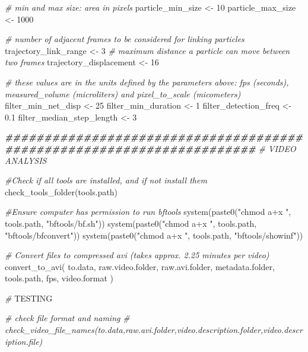 \documentclass[
]{article}
\newenvironment{Shaded}{\begin{snugshade}}{\end{snugshade}}
\newcommand{\AlertTok}[1]{\textcolor[rgb]{0.94,0.16,0.16}{#1}}
\newcommand{\CommentTok}[1]{\textcolor[rgb]{0.56,0.35,0.01}{\textit{#1}}}
\newcommand{\DecValTok}[1]{\textcolor[rgb]{0.00,0.00,0.81}{#1}}
\newcommand{\DocumentationTok}[1]{\textcolor[rgb]{0.56,0.35,0.01}{\textbf{\textit{#1}}}}
\newcommand{\FloatTok}[1]{\textcolor[rgb]{0.00,0.00,0.81}{#1}}
\newcommand{\FunctionTok}[1]{\textcolor[rgb]{0.00,0.00,0.00}{#1}}
\newcommand{\NormalTok}[1]{#1}
\newcommand{\OtherTok}[1]{\textcolor[rgb]{0.56,0.35,0.01}{#1}}
\newcommand{\StringTok}[1]{\textcolor[rgb]{0.31,0.60,0.02}{#1}}
\begin{document}
\begin{Shaded}
\begin{Highlighting}[]
\CommentTok{\# min and max size: area in pixels}
\NormalTok{particle\_min\_size }\OtherTok{\textless{}{-}} \DecValTok{10}
\NormalTok{particle\_max\_size }\OtherTok{\textless{}{-}} \DecValTok{1000}

\CommentTok{\# number of adjacent frames to be considered for linking particles}
\NormalTok{trajectory\_link\_range }\OtherTok{\textless{}{-}} \DecValTok{3}
\CommentTok{\# maximum distance a particle can move between two frames}
\NormalTok{trajectory\_displacement }\OtherTok{\textless{}{-}} \DecValTok{16}

\CommentTok{\# these values are in the units defined by the parameters above: fps (seconds), measured\_volume (microliters) and pixel\_to\_scale (micometers)}
\NormalTok{filter\_min\_net\_disp }\OtherTok{\textless{}{-}} \DecValTok{25}
\NormalTok{filter\_min\_duration }\OtherTok{\textless{}{-}} \DecValTok{1}
\NormalTok{filter\_detection\_freq }\OtherTok{\textless{}{-}} \FloatTok{0.1}
\NormalTok{filter\_median\_step\_length }\OtherTok{\textless{}{-}} \DecValTok{3}

\DocumentationTok{\#\#\#\#\#\#\#\#\#\#\#\#\#\#\#\#\#\#\#\#\#\#\#\#\#\#\#\#\#\#\#\#\#\#\#\#\#\#\#\#\#\#\#\#\#\#\#\#\#\#\#\#\#\#\#\#\#\#\#\#\#\#\#\#\#\#\#\#\#\#}
\CommentTok{\# VIDEO ANALYSIS}

\CommentTok{\#Check if all tools are installed, and if not install them}
\FunctionTok{check\_tools\_folder}\NormalTok{(tools.path)}

\CommentTok{\#Ensure computer has permission to run bftools}
\FunctionTok{system}\NormalTok{(}\FunctionTok{paste0}\NormalTok{(}\StringTok{"chmod a+x "}\NormalTok{, tools.path, }\StringTok{"bftools/bf.sh"}\NormalTok{))}
\FunctionTok{system}\NormalTok{(}\FunctionTok{paste0}\NormalTok{(}\StringTok{"chmod a+x "}\NormalTok{, tools.path, }\StringTok{"bftools/bfconvert"}\NormalTok{))}
\FunctionTok{system}\NormalTok{(}\FunctionTok{paste0}\NormalTok{(}\StringTok{"chmod a+x "}\NormalTok{, tools.path, }\StringTok{"bftools/showinf"}\NormalTok{))}

\CommentTok{\# Convert files to compressed avi (takes approx. 2.25 minutes per video)}
\FunctionTok{convert\_to\_avi}\NormalTok{(}
\NormalTok{  to.data,}
\NormalTok{  raw.video.folder,}
\NormalTok{  raw.avi.folder,}
\NormalTok{  metadata.folder,}
\NormalTok{  tools.path,}
\NormalTok{  fps,}
\NormalTok{  video.format}
\NormalTok{)}


\CommentTok{\# }\AlertTok{TESTING}

\CommentTok{\# check file format and naming}
\CommentTok{\# check\_video\_file\_names(to.data,raw.avi.folder,video.description.folder,video.description.file)}


\end{Highlighting}
\end{Shaded}
\end{document}
